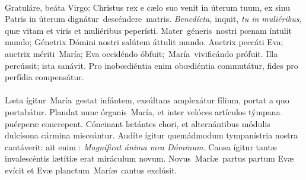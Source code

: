\documentclass[options]{article}
\begin{document}
	\\
	Gratuláre, beáta Virgo: Christus rex e cælo suo venit in úterum tuum, ex sinu Patris in úterum dignátur descéndere matris. \emph{Benedícta,} inquit, \emph{tu in muliéribus,} quæ vitam et viris et muliéribus peperísti. Mater géneris nostri pœnam íntulit mundo; Génetrix Dómini nostri salútem áttulit mundo. Auctrix peccáti Eva; auctrix mériti María; Eva occidéndo óbfuit; María vivificándo prófuit. Illa percússit; ista sanávit. Pro inobœdiéntia enim obœdiéntia commutátur, fides pro perfídia compensátur.\\
	\\
	Læta ígitur María gestat infántem, exsúltans amplexátur fílium, portat a quo portabátur. Plaudat nunc órganis María, et inter velóces artículos týmpana puérperæ concrepent. Cóncinant lætántes chori, et alternántibus módulis dulcísona cármina misceántur. Audíte ígitur quemádmodum tympanístria nostra cantáverit: ait enim : \emph{Magníficat ánima mea Dóminum.} Causa ígitur tantæ invalescéntis lætítiæ erat miráculum novum. Novus Maríæ partus partum Evæ evícit et Evæ planctum Maríæ cantus exclúsit.	
\end{document}
